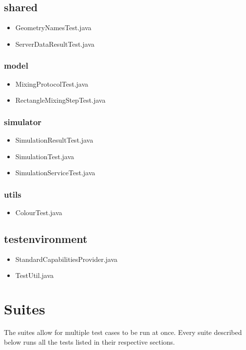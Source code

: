 \subsection{shared}
\begin{itemize}
\item GeometryNamesTest.java
\item ServerDataResultTest.java
\end{itemize}
\subsubsection{model}
\begin{itemize}
\item MixingProtocolTest.java
\item RectangleMixingStepTest.java
\end{itemize}
\subsubsection{simulator}
\begin{itemize}
\item SimulationResultTest.java
\item SimulationTest.java
\item SimulationServiceTest.java
\end{itemize}
\subsubsection{utils}
\begin{itemize}
\item ColourTest.java
\end{itemize}

\subsection{testenvironment}
\begin{itemize}
\item StandardCapabilitiesProvider.java
\item TestUtil.java
\end{itemize} 

\section{Suites}
The suites allow for multiple test cases to be run at once. Every suite described below runs all the tests listed in their respective sections.

